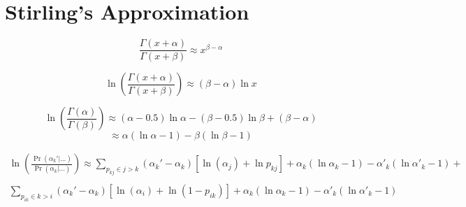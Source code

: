 \documentclass{article}
\begin{document}
\section{Stirling's Approximation}

\[
\frac{\Gamma(x + \alpha)}{\Gamma(x + \beta)} \approx  x^{\beta - \alpha}
\]

\[
\ln\left(\frac{\Gamma(x + \alpha)}{\Gamma(x + \beta)}\right) \approx  (\beta - \alpha)\ln x
\]

\[
\ln\left(\frac{\Gamma(\alpha)}{\Gamma(\beta)}\right) \approx (\alpha - 0.5) \ln\alpha - (\beta - 0.5)\ln \beta + (\beta - \alpha)
\]
\[
\approx \alpha(\ln\alpha - 1) - \beta(\ln\beta - 1)
\]


\begin{multline}
\ln\left(\frac{\Pr(\alpha_k'|...)}{\Pr(\alpha_k|...)}\right) \approx \sum_{p_{kj} \in
    j > k} (\alpha_k' - \alpha_k)\left[\ln (\alpha_j) + \ln p_{kj}\right] + 
\alpha_k(\ln\alpha_k - 1) - \alpha'_k(\ln\alpha'_k - 1) +\\
\\
 \sum_{p_{ik} \in
    k > i}  (\alpha_k' - \alpha_k)\left[\ln (\alpha_i) + \ln (1 - p_{ik})\right] + 
    \alpha_k(\ln\alpha_k - 1) - \alpha'_k(\ln\alpha'_k - 1)\\
\end{multline}
\end{document}
